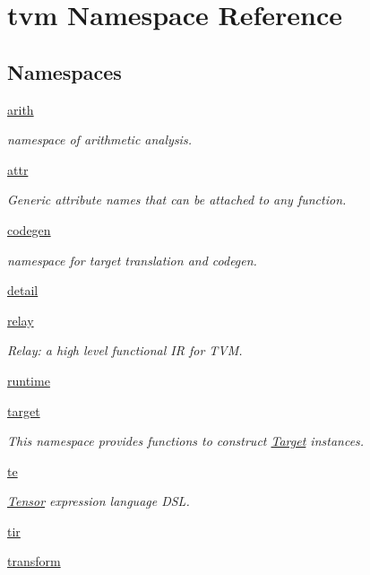 \hypertarget{namespacetvm}{}\section{tvm Namespace Reference}
\label{namespacetvm}
\subsection*{Namespaces}
\begin{DoxyCompactItemize}
\item 
 \hyperlink{namespacetvm_1_1arith}{arith}
\begin{DoxyCompactList}\small\item\em namespace of arithmetic analysis. \end{DoxyCompactList}\item 
 \hyperlink{namespacetvm_1_1attr}{attr}
\begin{DoxyCompactList}\small\item\em Generic attribute names that can be attached to any function. \end{DoxyCompactList}\item 
 \hyperlink{namespacetvm_1_1codegen}{codegen}
\begin{DoxyCompactList}\small\item\em namespace for target translation and codegen. \end{DoxyCompactList}\item 
 \hyperlink{namespacetvm_1_1detail}{detail}
\item 
 \hyperlink{namespacetvm_1_1relay}{relay}
\begin{DoxyCompactList}\small\item\em Relay\+: a high level functional IR for T\+VM. \end{DoxyCompactList}\item 
 \hyperlink{namespacetvm_1_1runtime}{runtime}
\item 
 \hyperlink{namespacetvm_1_1target}{target}
\begin{DoxyCompactList}\small\item\em This namespace provides functions to construct \hyperlink{classtvm_1_1Target}{Target} instances. \end{DoxyCompactList}\item 
 \hyperlink{namespacetvm_1_1te}{te}
\begin{DoxyCompactList}\small\item\em \hyperlink{classtvm_1_1te_1_1Tensor}{Tensor} expression language D\+SL. \end{DoxyCompactList}\item 
 \hyperlink{namespacetvm_1_1tir}{tir}
\item 
 \hyperlink{namespacetvm_1_1transform}{transform}
\end{DoxyCompactItemize}
